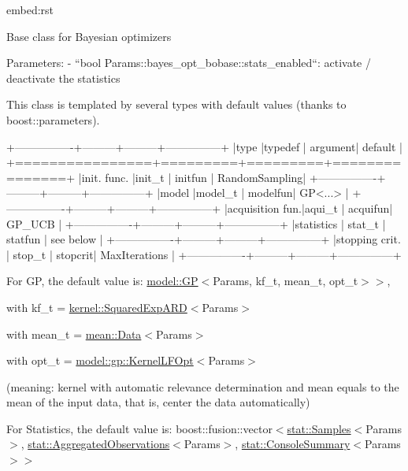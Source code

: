 \begin{DoxyVerb}embed:rst

Base class for Bayesian optimizers

Parameters:
  - ``bool Params::bayes_opt_bobase::stats_enabled``: activate / deactivate the statistics

This class is templated by several types with default values (thanks to boost::parameters).

+----------------+---------+---------+---------------+
|type            |typedef  | argument| default       |
+================+=========+=========+===============+
|init. func.     |init_t   | initfun | RandomSampling|
+----------------+---------+---------+---------------+
|model           |model_t  | modelfun| GP<...>       |
+----------------+---------+---------+---------------+
|acquisition fun.|aqui_t   | acquifun| GP_UCB        |
+----------------+---------+---------+---------------+
|statistics      | stat_t  | statfun | see below     |
+----------------+---------+---------+---------------+
|stopping crit.  | stop_t  | stopcrit| MaxIterations |
+----------------+---------+---------+---------------+\end{DoxyVerb}


For G\+P, the default value is\+: {\ttfamily \hyperlink{classlimbo_1_1model_1_1_g_p}{model\+::\+G\+P}$<$Params, kf\+\_\+t, mean\+\_\+t, opt\+\_\+t$>$$>$},
\begin{DoxyItemize}
\item with {\ttfamily kf\+\_\+t = \hyperlink{structlimbo_1_1kernel_1_1_squared_exp_a_r_d}{kernel\+::\+Squared\+Exp\+A\+R\+D}$<$Params$>$}
\item with {\ttfamily mean\+\_\+t = \hyperlink{structlimbo_1_1mean_1_1_data}{mean\+::\+Data}$<$Params$>$}
\item with {\ttfamily opt\+\_\+t = \hyperlink{structlimbo_1_1model_1_1gp_1_1_kernel_l_f_opt}{model\+::gp\+::\+Kernel\+L\+F\+Opt}$<$Params$>$}
\end{DoxyItemize}

(meaning\+: kernel with automatic relevance determination and mean equals to the mean of the input data, that is, center the data automatically)

For Statistics, the default value is\+: {\ttfamily boost\+::fusion\+::vector$<$\hyperlink{structlimbo_1_1stat_1_1_samples}{stat\+::\+Samples}$<$Params$>$, \hyperlink{structlimbo_1_1stat_1_1_aggregated_observations}{stat\+::\+Aggregated\+Observations}$<$Params$>$, \hyperlink{structlimbo_1_1stat_1_1_console_summary}{stat\+::\+Console\+Summary}$<$Params$>$$>$}


